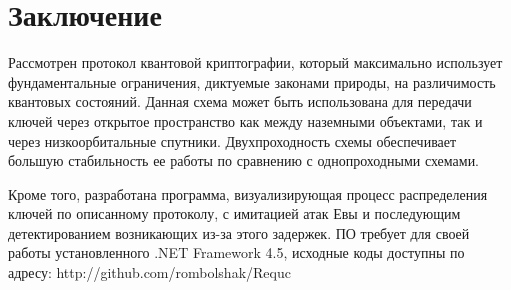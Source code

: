 \section*{Заключение}				%
Рассмотрен протокол квантовой криптографии, который максимально использует фундаментальные ограничения, диктуемые законами природы, на различимость квантовых состояний. Данная схема может быть использована для передачи ключей через открытое пространство как между наземными объектами, так и через низкоорбитальные спутники. Двухпроходность схемы обеспечивает большую стабильность ее работы по сравнению с однопроходными схемами.

Кроме того, разработана программа, визуализирующая процесс распределения ключей по описанному протоколу, с имитацией атак Евы и последующим детектированием возникающих из-за этого задержек.
ПО требует для своей работы установленного .NET Framework 4.5, исходные коды доступны по адресу: http://github.com/rombolshak/Requc